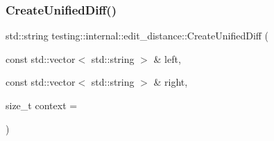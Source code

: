 \mbox{\label{namespacetesting_1_1internal_1_1edit__distance_ac4c24a581ff433d7aca7ed12c9133fb1}} 
\subsubsection{\texorpdfstring{Create\+Unified\+Diff()}{CreateUnifiedDiff()}}
{\footnotesize\ttfamily std\+::string testing\+::internal\+::edit\+\_\+distance\+::\+Create\+Unified\+Diff (\begin{DoxyParamCaption}\item[{const std\+::vector$<$ std\+::string $>$ \&}]{left,  }\item[{const std\+::vector$<$ std\+::string $>$ \&}]{right,  }\item[{size\+\_\+t}]{context = {} }\end{DoxyParamCaption})}

